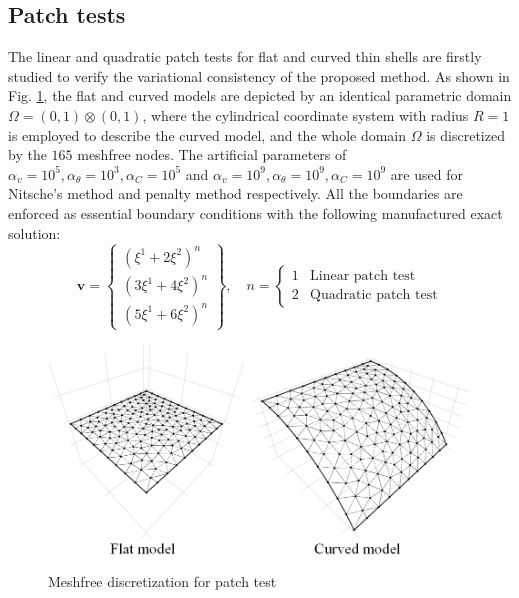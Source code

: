 \subsection{Patch tests}
The linear and quadratic patch tests for flat and curved thin shells are firstly studied to verify the variational consistency of the proposed method. As shown in Fig. \ref{ptf1}, the flat and curved models are depicted by an identical parametric domain $\Omega = (0,1)\otimes(0,1)$, where the cylindrical coordinate system with radius $R=1$ is employed to describe the curved model, and the whole domain $\Omega$ is discretized by the $165$ meshfree nodes. The artificial parameters of $\alpha_v=10^5, \alpha_\theta=10^3, \alpha_C=10^5$ and $\alpha_v=10^9, \alpha_\theta=10^9, \alpha_C=10^9$ are used for Nitsche's method and penalty method respectively. All the boundaries are enforced as essential boundary conditions with the following manufactured exact solution:
\begin{equation}
\boldsymbol v = \begin{Bmatrix}
(\xi^1+2\xi^2)^n \\ (3\xi^1+4\xi^2)^n \\ (5\xi^1+6\xi^2)^n
\end{Bmatrix},\quad
n = \begin{cases}
1 & \text{Linear patch test} \\
2 & \text{Quadratic patch test}
\end{cases}
\end{equation}

\begin{figure}[!ht]
    \centering
    \includegraphics[width=\textwidth]{figures/ptmsh}
    \caption{Meshfree discretization for patch test}\label{ptf1}
\end{figure}


